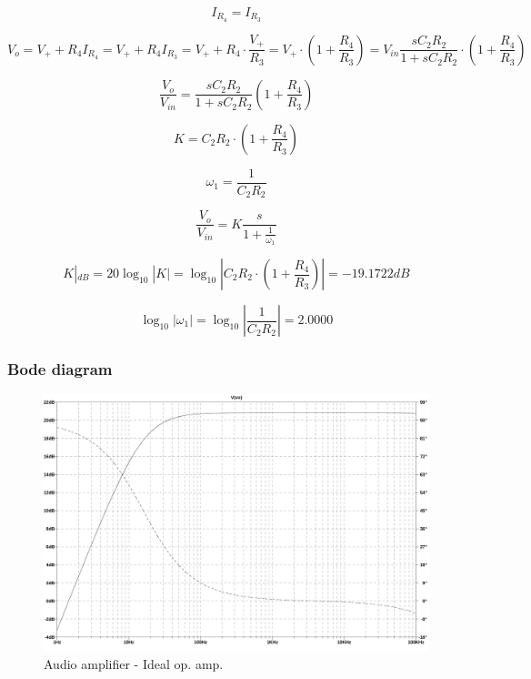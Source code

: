 \documentclass[10pt,a4paper]{article}
\begin{document}
\begin{equation} \label{eq:I_R4}
I_{R_4} = I_{R_3}
\end{equation}

\begin{equation} \label{eq:V_o}
V_o = V_+ + R_4I_{R_4} = V_+ + R_4 I_{R_3} = V_+ + R_4 \cdot \frac{V_+}{R_3} =
V_+ \cdot \left(1 + \frac{R_4}{R_3} \right) =
V_{in}\frac{sC_2R_2}{1+sC_2R_2} \cdot \left(1 + \frac{R_4}{R_3} \right)
\end{equation}

\begin{equation} \label{eq:TF}
\frac{V_o}{V_{in}} = \frac{sC_2R_2}{1+sC_2R_2}\left(1+\frac{R_4}{R_3}\right)
\end{equation}

\begin{equation} \label{eq:K}
K = C_2R_2 \cdot \left(1+\frac{R_4}{R_3}\right)
\end{equation}

\begin{equation} \label{eq:omega_1}
 \omega_1 = \frac{1}{C_2R_2}
\end{equation}

\begin{equation} \label{eq:TFBode}
\frac{V_o}{V_{in}} = K \frac{s}{1+\frac{1}{\omega_1}}
\end{equation}

\begin{equation} \label{eq:KdB}
 K|_{dB} = 20\log_{10}|K| = \log_{10}\left|C_2R_2 \cdot \left(1+\frac{R_4}{R_3}\right)\right| = -19.1722 dB
\end{equation}

\begin{equation} \label{eq:omega_1log}
\log_{10} |\omega_1| =
\log_{10} \left| \frac{1}{C_2R_2} \right|= 2.0000
\end{equation}

\subsubsection{Bode diagram}
\begin{figure}[h]
  \centering
  \includegraphics[width=14cm]{graph/1d1.jpg}
  \caption{Audio amplifier - Ideal op. amp.}
  \label{1d1graph}
\end{figure}
\end{document}
